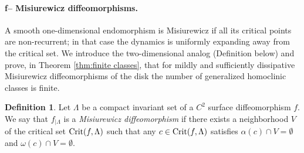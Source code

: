 \documentclass[a4paper,11pt]{article}
\newtheorem{theorem}{Theorem}
\newtheorem{theoremName}{Theorem}
\theoremstyle{definition}
\newtheorem{definition}[lemma]{Definition}
\def\La{\Lambda}
\def\La{\Lambda}
\def\al{\alpha}
\def\emp{\emptyset}
\begin{document}
\paragraph{f-- Misiurewicz diffeomorphisms.}

A smooth one-dimensional endomorphism is Misiurewicz if all its critical points are non-recurrent; in that case the dynamics is uniformly expanding away from the critical set. We introduce the two-dimensional analog (Definition below) and prove, in Theorem \ref{thm:finite classes}, that for mildly and sufficiently dissipative Misiurewicz diffeomorphisms of the disk the number of generalized homoclinic classes is finite.



\begin{definition}
 Let $\La$ be a compact invariant set of a $C^{2}$ surface diffeomorphism $f$. We say that $f_{|\La}$ is a  {\it Misiurewicz diffeomorphism} if there exists a neighborhood $V$ of the critical set ${\rm Crit}(f, \La)$ such that  any $c\in {\rm Crit}(f, \La)$ satisfies $\al(c)\cap  V=\emp$ and $\omega(c)\cap V =\emp$.
\end{definition}








\vskip 3pt

%  
\end{document}
